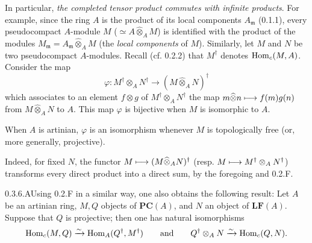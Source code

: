 In particular, \emph{the completed tensor product commutes with infinite products}. For example, since the ring $A$ is the product of its local components $A_{\mathfrak m}$ (0.1.1), every pseudocompact $A$-module $M$ ($\simeq A\widehat\otimes_A M$) is identified with the product of the modules $M_{\mathfrak m}=A_{\mathfrak m}\widehat\otimes_A M$ (the \emph{local components} of $M$).
Similarly, let $M$ and $N$ be two pseudocompact $A$-modules. Recall (cf. 0.2.2) that $M^\dagger$ denotes $\operatorname{Hom}_c(M,A)$. Consider the map
\[
\varphi:M^\dagger\otimes_A N^\dagger\to(M\widehat\otimes_A N)^\dagger
\]
which associates to an element $f\otimes g$ of $M^\dagger\otimes_A N^\dagger$ the map $m\widehat\otimes n\longmapsto f(m)g(n)$ from $M\widehat\otimes_A N$ to $A$. This map $\varphi$ is bijective when $M$ is isomorphic to $A$.
\begin{corollary}{}
When $A$ is artinian, $\varphi$ is an isomorphism whenever $M$ is topologically free (or, more generally, projective).
\end{corollary}
Indeed, for fixed $N$, the functor $M\longmapsto(M\widehat\otimes_A N)^\dagger$ (resp. $M\longmapsto M^\dagger\otimes_A N^\dagger$) transforms every direct product into a direct sum, by the foregoing and 0.2.F.

\begin{remark}{0.3.6.A}\label{VIIB.0.3.6.A}Using 0.2.F in a similar way, one also obtains the following result: Let $A$ be an artinian ring, $M,Q$ objects of $\mathbf{PC}(A)$, and $N$ an object of $\mathbf{LF}(A)$. Suppose that $Q$ is projective; then one has natural isomorphisms
\[
\operatorname{Hom}_c(M,Q)\xrightarrow{\sim}\operatorname{Hom}_A(Q^\dagger,M^\dagger)\qquad\text{and}\qquad
Q^\dagger\otimes_A N\xrightarrow{\sim}\operatorname{Hom}_c(Q,N).
\]
\end{remark}

